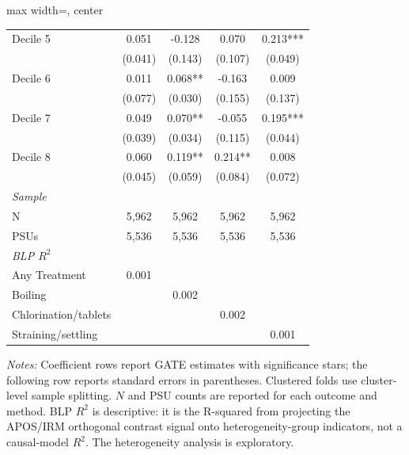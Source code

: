 \begin{landscape}
\begin{table}[p]
\begin{adjustbox}{max width=\linewidth, center}
\begin{tabular}{lcccc}
Decile 5 & 0.051 & -0.128 & 0.070 & 0.213*** \\
 & (0.041) & (0.143) & (0.107) & (0.049) \\
Decile 6 & 0.011 & 0.068** & -0.163 & 0.009 \\
 & (0.077) & (0.030) & (0.155) & (0.137) \\
Decile 7 & 0.049 & 0.070** & -0.055 & 0.195*** \\
 & (0.039) & (0.034) & (0.115) & (0.044) \\
Decile 8 & 0.060 & 0.119** & 0.214** & 0.008 \\
 & (0.045) & (0.059) & (0.084) & (0.072) \\
\multicolumn{5}{l}{\textit{Sample}} \\
\quad N & 5,962 & 5,962 & 5,962 & 5,962 \\
\quad PSUs & 5,536 & 5,536 & 5,536 & 5,536 \\
\multicolumn{5}{l}{\textit{BLP $R^{2}$}} \\
\quad Any Treatment & 0.001 &  &  &  \\
\quad Boiling &  & 0.002 &  &  \\
\quad Chlorination/tablets &  &  & 0.002 &  \\
\quad Straining/settling &  &  &  & 0.001 \\
\bottomrule
\end{tabular}
\end{adjustbox}
\par\vspace{3pt}
\begin{minipage}{\linewidth}\footnotesize \textit{Notes:} Coefficient rows report GATE estimates with significance stars; the following row reports standard errors in parentheses. Clustered folds use cluster-level sample splitting. $N$ and PSU counts are reported for each outcome and method. BLP $R^2$ is descriptive: it is the R-squared from projecting the APOS/IRM orthogonal contrast signal onto heterogeneity-group indicators, not a causal-model $R^2$. The heterogeneity analysis is exploratory.\end{minipage}
\end{table}
\end{landscape}